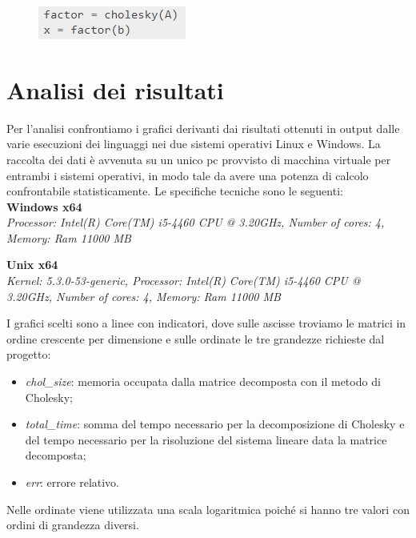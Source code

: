 \documentclass[a4paper,12pt]{article}
\begin{document}
\begin{figure}[H]
	\centering
	\includegraphics[width=0.4\linewidth]{img/python1.jpg}
\end{figure}

\newpage

\section{Analisi dei risultati}
Per l’analisi confrontiamo i grafici derivanti dai risultati ottenuti in output dalle varie esecuzioni dei linguaggi nei due sistemi operativi Linux e Windows. 
La raccolta dei dati è avvenuta su un unico pc provvisto di macchina virtuale per entrambi i sistemi operativi, in modo tale da avere una potenza di calcolo confrontabile statisticamente.
Le specifiche tecniche sono le seguenti: \\

\noindent \textbf{Windows x64} \\
\textit{Processor: Intel(R) Core(TM) i5-4460  CPU @ 3.20GHz, Number of cores: 4, Memory: Ram 11000 MB\\}

\noindent \textbf{Unix x64} \\
\textit{Kernel: 5.3.0-53-generic, Processor: Intel(R) Core(TM) i5-4460  CPU @ 3.20GHz, Number of cores: 4, Memory: Ram 11000 MB\\}


\noindent I grafici scelti sono a linee con indicatori, dove sulle ascisse troviamo le matrici in ordine crescente per dimensione e sulle ordinate le tre grandezze richieste dal progetto:
\begin{itemize}
\item \textit{chol\_size}: memoria occupata dalla matrice decomposta con il metodo di Cholesky;
\item \textit{total\_time}: somma del tempo necessario per la decomposizione di Cholesky e del tempo necessario per la risoluzione del sistema lineare data la matrice decomposta;
\item \textit{err}: errore relativo.
\end{itemize}
\bigskip

\noindent Nelle ordinate viene utilizzata una scala logaritmica poiché si hanno tre valori con ordini di grandezza diversi.
 
\end{document}
